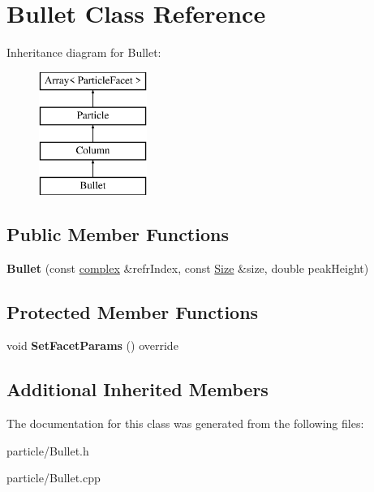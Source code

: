 \hypertarget{class_bullet}{}\section{Bullet Class Reference}
\label{class_bullet}
Inheritance diagram for Bullet\+:\begin{figure}[H]
\begin{center}
\leavevmode
\includegraphics[height=4.000000cm]{class_bullet}
\end{center}
\end{figure}
\subsection*{Public Member Functions}
\begin{DoxyCompactItemize}
\item 
\mbox{\label{class_bullet_a5bcdbed105749412de2da8f7ed0331fa}} 
{\bfseries Bullet} (const \mbox{\hyperlink{classcomplex}{complex}} \&refr\+Index, const \mbox{\hyperlink{struct_size}{Size}} \&size, double peak\+Height)
\end{DoxyCompactItemize}
\subsection*{Protected Member Functions}
\begin{DoxyCompactItemize}
\item 
\mbox{\label{class_bullet_a5a6567716e528cebd8718dd728f5f85c}} 
void {\bfseries Set\+Facet\+Params} () override
\end{DoxyCompactItemize}
\subsection*{Additional Inherited Members}


The documentation for this class was generated from the following files\+:\begin{DoxyCompactItemize}
\item 
particle/Bullet.\+h\item 
particle/Bullet.\+cpp\end{DoxyCompactItemize}
